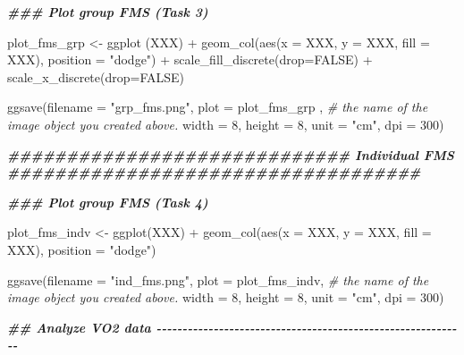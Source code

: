 \documentclass[
]{book}
\newenvironment{Shaded}{\begin{snugshade}}{\end{snugshade}}
\newcommand{\AttributeTok}[1]{\textcolor[rgb]{0.77,0.63,0.00}{#1}}
\newcommand{\CommentTok}[1]{\textcolor[rgb]{0.56,0.35,0.01}{\textit{#1}}}
\newcommand{\ConstantTok}[1]{\textcolor[rgb]{0.00,0.00,0.00}{#1}}
\newcommand{\DecValTok}[1]{\textcolor[rgb]{0.00,0.00,0.81}{#1}}
\newcommand{\DocumentationTok}[1]{\textcolor[rgb]{0.56,0.35,0.01}{\textbf{\textit{#1}}}}
\newcommand{\FunctionTok}[1]{\textcolor[rgb]{0.00,0.00,0.00}{#1}}
\newcommand{\NormalTok}[1]{#1}
\newcommand{\OtherTok}[1]{\textcolor[rgb]{0.56,0.35,0.01}{#1}}
\newcommand{\SpecialCharTok}[1]{\textcolor[rgb]{0.00,0.00,0.00}{#1}}
\newcommand{\StringTok}[1]{\textcolor[rgb]{0.31,0.60,0.02}{#1}}
\begin{document}
\begin{Shaded}
\begin{Highlighting}[]
\DocumentationTok{\#\#\# Plot group FMS (Task 3)}

\NormalTok{plot\_fms\_grp }\OtherTok{\textless{}{-}} \FunctionTok{ggplot}\NormalTok{ (XXX) }\SpecialCharTok{+}
  \FunctionTok{geom\_col}\NormalTok{(}\FunctionTok{aes}\NormalTok{(}\AttributeTok{x =}\NormalTok{ XXX, }\AttributeTok{y =}\NormalTok{ XXX, }\AttributeTok{fill =}\NormalTok{ XXX), }\AttributeTok{position =} \StringTok{"dodge"}\NormalTok{) }\SpecialCharTok{+}
  \FunctionTok{scale\_fill\_discrete}\NormalTok{(}\AttributeTok{drop=}\ConstantTok{FALSE}\NormalTok{) }\SpecialCharTok{+}
  \FunctionTok{scale\_x\_discrete}\NormalTok{(}\AttributeTok{drop=}\ConstantTok{FALSE}\NormalTok{)}

\FunctionTok{ggsave}\NormalTok{(}\AttributeTok{filename =} \StringTok{"grp\_fms.png"}\NormalTok{, }
       \AttributeTok{plot =}\NormalTok{ plot\_fms\_grp , }\CommentTok{\# the name of the image object you created above.}
       \AttributeTok{width =} \DecValTok{8}\NormalTok{, }
       \AttributeTok{height =} \DecValTok{8}\NormalTok{, }
       \AttributeTok{unit =} \StringTok{"cm"}\NormalTok{, }
       \AttributeTok{dpi =} \DecValTok{300}\NormalTok{)}

\DocumentationTok{\#\#\#\#\#\#\#\#\#\#\#\#\#\#\#\#\#\#\#\#\#\#\#\#\#\#\#\#\# Individual FMS \#\#\#\#\#\#\#\#\#\#\#\#\#\#\#\#\#\#\#\#\#\#\#\#\#\#\#\#\#\#\#\#\#\#\#}

\DocumentationTok{\#\#\# Plot group FMS (Task 4)}

\NormalTok{plot\_fms\_indv }\OtherTok{\textless{}{-}} \FunctionTok{ggplot}\NormalTok{(XXX) }\SpecialCharTok{+}
  \FunctionTok{geom\_col}\NormalTok{(}\FunctionTok{aes}\NormalTok{(}\AttributeTok{x =}\NormalTok{ XXX, }\AttributeTok{y =}\NormalTok{ XXX, }\AttributeTok{fill =}\NormalTok{ XXX), }\AttributeTok{position =} \StringTok{"dodge"}\NormalTok{)}

\FunctionTok{ggsave}\NormalTok{(}\AttributeTok{filename =} \StringTok{"ind\_fms.png"}\NormalTok{, }
       \AttributeTok{plot =}\NormalTok{ plot\_fms\_indv, }\CommentTok{\# the name of the image object you created above.}
       \AttributeTok{width =} \DecValTok{8}\NormalTok{, }
       \AttributeTok{height =} \DecValTok{8}\NormalTok{, }
       \AttributeTok{unit =} \StringTok{"cm"}\NormalTok{, }
       \AttributeTok{dpi =} \DecValTok{300}\NormalTok{)}


\DocumentationTok{\#\# Analyze VO2 data {-}{-}{-}{-}{-}{-}{-}{-}{-}{-}{-}{-}{-}{-}{-}{-}{-}{-}{-}{-}{-}{-}{-}{-}{-}{-}{-}{-}{-}{-}{-}{-}{-}{-}{-}{-}{-}{-}{-}{-}{-}{-}{-}{-}{-}{-}{-}{-}{-}{-}{-}{-}{-}{-}{-}{-}{-}{-}{-}{-}}


\end{Highlighting}
\end{Shaded}
\end{document}
